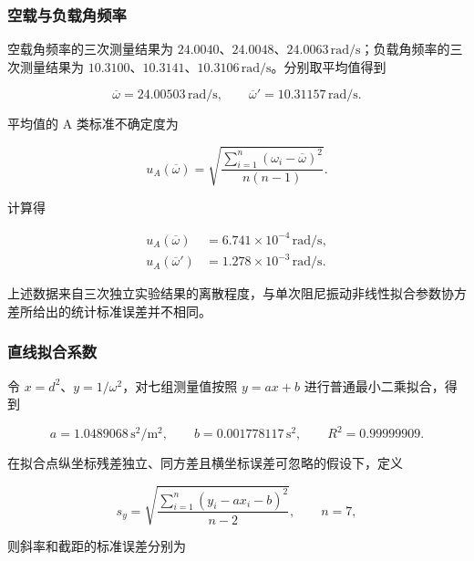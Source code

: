 \documentclass[UTF8]{ctexart}
\begin{document}
\subsubsection{空载与负载角频率}

空载角频率的三次测量结果为 $24.0040$、$24.0048$、$24.0063\,\mathrm{rad/s}$；负载角频率的三次测量结果为 $10.3100$、$10.3141$、$10.3106\,\mathrm{rad/s}$。分别取平均值得到

\begin{equation}
 \overline\omega=24.00503\,\mathrm{rad/s},\qquad
 \overline\omega'=10.31157\,\mathrm{rad/s}.
\end{equation}

平均值的 A 类标准不确定度为

\begin{equation}
 u_A(\overline\omega)=\sqrt{\frac{\sum_{i=1}^{n}(\omega_i-\overline\omega)^2}{n(n-1)}}.
\end{equation}

计算得

\begin{equation}
 \begin{aligned}
 u_A(\overline\omega)&=6.741\times10^{-4}\,\mathrm{rad/s},\\
 u_A(\overline\omega')&=1.278\times10^{-3}\,\mathrm{rad/s}.
 \end{aligned}
\end{equation}

上述数据来自三次独立实验结果的离散程度，与单次阻尼振动非线性拟合参数协方差所给出的统计标准误差并不相同。

\subsubsection{直线拟合系数}

令 $x=d^2$、$y=1/\omega^2$，对七组测量值按照 $y=ax+b$ 进行普通最小二乘拟合，得到

\begin{equation}
 a=1.0489068\,\mathrm{s^2/m^2},\qquad
 b=0.001778117\,\mathrm{s^2},\qquad R^2=0.99999909.
\end{equation}

在拟合点纵坐标残差独立、同方差且横坐标误差可忽略的假设下，定义

\begin{equation}
 s_y=\sqrt{\frac{\sum_{i=1}^{n}(y_i-ax_i-b)^2}{n-2}},\qquad n=7,
\end{equation}

则斜率和截距的标准误差分别为
\end{document}
